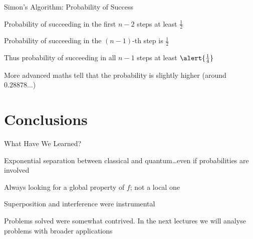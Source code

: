 \documentclass{beamer}
\begin{document}
\begin{frame}{Simon's Algorithm: Probability of Success}

       Probability of succeeding in the first $n-2$ steps at least $\frac{1}{2}$

       Probability of succeeding in the $(n-1)$-th step is $\frac{1}{2}$

       Thus probability of succeeding in all $n-1$ steps at least $\alert{\frac{1}{4}}$

       \vspace{0.5cm}
       \pause
       More advanced maths tell that the probability is slightly higher
       (around $0.28878\dots$)
\end{frame}

\section{Conclusions}

\begin{frame}{What Have We Learned?}

        \alert{Exponential separation} between classical and
        quantum\dots even if probabilities are involved

        \pause
        Always looking for a \alert{global} property of $f$; not a
        local one

        \pause
        Superposition and interference were instrumental 

        \vspace{0.5cm}
        \pause
        Problems solved were somewhat contrived. In the next lectures we
        will analyse problems with broader applications
\end{frame}
\end{document}
